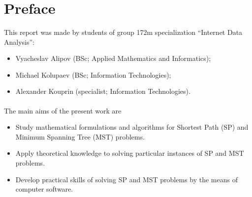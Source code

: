 \section{Preface}

\paragraph{}
	This report was made by students of group 172m specialization ``Internet Data Analysis'':

\begin{itemize}
	\item Vyacheslav Alipov (BSc; Applied Mathematics and Informatics);
	\item Michael Kolupaev (BSc; Information Technologies);
	\item Alexander Kouprin (specialist; Information Technologies).
\end{itemize}

\paragraph{}
	The main aims of the present work are 
\begin{itemize}
	\item Study mathematical formulations and algorithms for Shortest Path (SP) and Minimum Spanning Tree (MST) problems.
	\item Apply theoretical knowledge to solving particular instances of SP and MST problems.
	\item Develop practical skills of solving SP and MST problems by the means of computer software.
\end{itemize}
